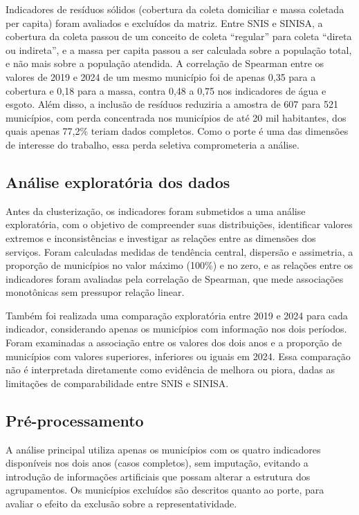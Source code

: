 \documentclass[12pt]{article}
\begin{document}
Indicadores de resíduos sólidos (cobertura da coleta domiciliar e massa coletada per capita) foram
avaliados e excluídos da matriz. Entre SNIS e SINISA, a cobertura da coleta passou de um conceito de
coleta ``regular'' para coleta ``direta ou indireta'', e a massa per capita passou a ser calculada
sobre a população total, e não mais sobre a população atendida. A correlação de Spearman entre os
valores de 2019 e 2024 de um mesmo município foi de apenas 0,35 para a cobertura e 0,18 para a massa,
contra 0,48 a 0,75 nos indicadores de água e esgoto. Além disso, a inclusão de resíduos reduziria a
amostra de 607 para 521 municípios, com perda concentrada nos municípios de até 20 mil habitantes, dos
quais apenas 77,2\% teriam dados completos. Como o porte é uma das dimensões de interesse do
trabalho, essa perda seletiva comprometeria a análise.

\subsection{Análise exploratória dos dados}

Antes da clusterização, os indicadores foram submetidos a uma análise exploratória, com o objetivo
de compreender suas distribuições, identificar valores extremos e inconsistências e investigar as
relações entre as dimensões dos serviços. Foram calculadas medidas de tendência central, dispersão
e assimetria, a proporção de municípios no valor máximo (100\%) e no zero, e as relações entre os
indicadores foram avaliadas pela correlação de Spearman, que mede associações monotônicas sem
pressupor relação linear.

Também foi realizada uma comparação exploratória entre 2019 e 2024 para cada indicador, considerando
apenas os municípios com informação nos dois períodos. Foram examinadas a associação entre os
valores dos dois anos e a proporção de municípios com valores superiores, inferiores ou iguais em
2024. Essa comparação não é interpretada diretamente como evidência de melhora ou piora, dadas as
limitações de comparabilidade entre SNIS e SINISA.

\subsection{Pré-processamento}
\label{sec:preproc}

A análise principal utiliza apenas os municípios com os quatro indicadores disponíveis nos dois anos
(casos completos), sem imputação, evitando a introdução de informações artificiais que possam alterar
a estrutura dos agrupamentos. Os municípios excluídos são descritos quanto ao porte, para avaliar o
efeito da exclusão sobre a representatividade.
\end{document}
